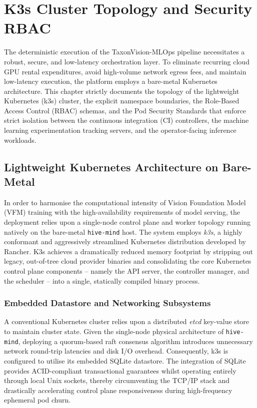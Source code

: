 \chapter{K3s Cluster Topology and Security RBAC}
\label{ch:k3s_cluster_topology}



The deterministic execution of the TaxonVision-MLOps pipeline necessitates a robust, secure, and low-latency orchestration layer. To eliminate recurring cloud GPU rental expenditures, avoid high-volume network egress fees, and maintain low-latency execution, the platform employs a bare-metal Kubernetes architecture. This chapter strictly documents the topology of the lightweight Kubernetes (k3s) cluster, the explicit namespace boundaries, the Role-Based Access Control (RBAC) schemas, and the Pod Security Standards that enforce strict isolation between the continuous integration (CI) controllers, the machine learning experimentation tracking servers, and the operator-facing inference workloads.

\section{Lightweight Kubernetes Architecture on Bare-Metal}
\label{sec:k3s_architecture}

In order to harmonise the computational intensity of Vision Foundation Model (VFM) training with the high-availability requirements of model serving, the deployment relies upon a single-node control plane and worker topology running natively on the bare-metal \texttt{hive-mind} host. The system employs \textit{k3s}, a highly conformant and aggressively streamlined Kubernetes distribution developed by Rancher. K3s achieves a dramatically reduced memory footprint by stripping out legacy, out-of-tree cloud provider binaries and consolidating the core Kubernetes control plane components -- namely the API server, the controller manager, and the scheduler -- into a single, statically compiled binary process.

\subsection{Embedded Datastore and Networking Subsystems}
A conventional Kubernetes cluster relies upon a distributed \textit{etcd} key-value store to maintain cluster state. Given the single-node physical architecture of \texttt{hive-mind}, deploying a quorum-based raft consensus algorithm introduces unnecessary network round-trip latencies and disk I/O overhead. Consequently, k3s is configured to utilise its embedded SQLite datastore. The integration of SQLite provides ACID-compliant transactional guarantees whilst operating entirely through local Unix sockets, thereby circumventing the TCP/IP stack and drastically accelerating control plane responsiveness during high-frequency ephemeral pod churn.

